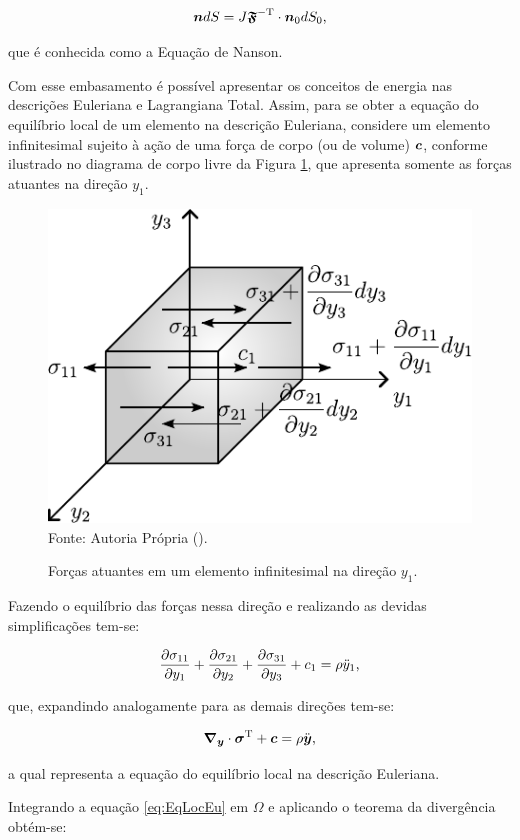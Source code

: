 \begin{equation}
    \boldsymbol{n}dS=J\boldsymbol{\mathfrak{F}}^\mathrm{-T}\cdot\boldsymbol{n}_0dS_0\text{,}\label{eq:Nanson}
\end{equation}

\noindent que é conhecida como a Equação de Nanson.

Com esse embasamento é possível apresentar os conceitos de energia nas descrições Euleriana e Lagrangiana Total. Assim, para se obter a equação do equilíbrio local de um elemento na descrição Euleriana, considere um elemento infinitesimal sujeito à ação de uma força de corpo (ou de volume) $\boldsymbol{c}$, conforme ilustrado no diagrama de corpo livre da Figura \ref{fig:CorpoLivreSolido}, que apresenta somente as forças atuantes na direção $y_1$.

\begin{figure}[h!]
    \centering
    \caption{Forças atuantes em um elemento infinitesimal na direção $y_1$.}
    \includegraphics[width=.5\linewidth]{Figuras/CorpoLivreSolido.pdf}
    \\Fonte: Autoria Própria (\the\year).
    \label{fig:CorpoLivreSolido}
\end{figure}

Fazendo o equilíbrio das forças nessa direção e realizando as devidas simplificações tem-se:

\[\frac{\partial{\sigma_{11}}}{\partial{y_1}}+\frac{\partial{\sigma_{21}}}{\partial{y_2}}+\frac{\partial{\sigma_{31}}}{\partial{y_3}}+c_1=\rho\ddot{y}_1\text{,}\]

\noindent que, expandindo analogamente para as demais direções tem-se:

\begin{equation}
    \boldsymbol{\nabla_y}\cdot\boldsymbol{\sigma}^\mathrm{T}+\boldsymbol{c}=\rho\ddot{\boldsymbol{y}}\text{,}
    \label{eq:EqLocEu}
\end{equation}

\noindent a qual representa a equação do equilíbrio local na descrição Euleriana.

Integrando a equação \eqref{eq:EqLocEu} em $\Omega$ e aplicando o teorema da divergência obtém-se:

